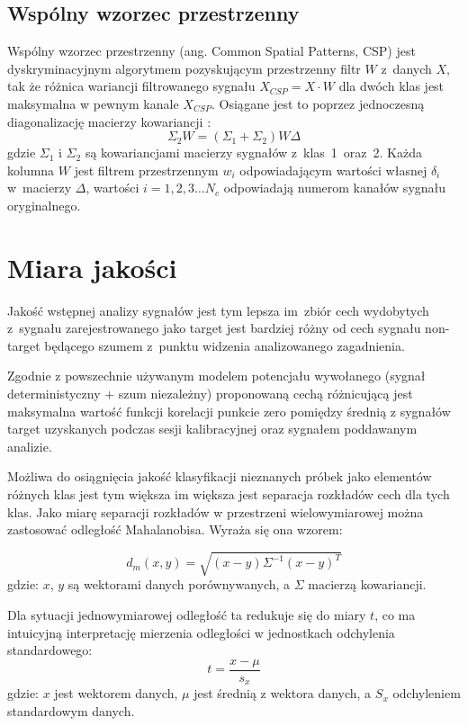 \documentclass[licencjacka,openright]{pracamgr}
\begin{document}
\subsection{Wspólny wzorzec przestrzenny}
Wspólny wzorzec przestrzenny (ang. Common Spatial Patterns, CSP) \citep{koles1990} jest dyskryminacyjnym algorytmem pozyskującym przestrzenny filtr $W$ z~danych $X$, tak że różnica wariancji filtrowanego sygnału \mbox{$X_{CSP} = X \cdot W$} dla dwóch klas jest maksymalna w pewnym kanale $X_{CSP}$. Osiągane jest to poprzez jednoczesną diagonalizację macierzy kowariancji \citep{samsek2012}:
\begin{equation}
\Sigma _2 W = (\Sigma _1 + \Sigma _2 )W \Delta
\end{equation}
gdzie $\Sigma_1$ i $\Sigma_2$ są kowariancjami macierzy sygnałów z~klas~1~oraz~2. Każda kolumna $W$ jest filtrem przestrzennym $w_i$ odpowiadającym wartości własnej $\delta _i$ w~macierzy $\Delta$, wartości $i = 1,2,3 \ldots N_c$ odpowiadają numerom kanałów sygnału oryginalnego.

\section{Miara jakości}
\label{miara}
Jakość wstępnej analizy sygnałów jest tym lepsza im~zbiór cech wydobytych z~sygnału zarejestrowanego jako target jest bardziej różny od cech sygnału non-target będącego szumem z~punktu widzenia analizowanego zagadnienia.

Zgodnie z powszechnie używanym modelem potencjału wywołanego (sygnał deterministyczny + szum niezależny) proponowaną cechą różnicującą jest maksymalna wartość funkcji korelacji punkcie zero pomiędzy średnią z sygnałów target uzyskanych podczas sesji kalibracyjnej oraz sygnałem poddawanym analizie.

Możliwa do osiągnięcia jakość klasyfikacji nieznanych próbek jako elementów różnych klas jest tym większa im większa jest separacja rozkładów cech dla tych klas. Jako miarę separacji rozkładów w przestrzeni wielowymiarowej można zastosować odległość Mahalanobisa. Wyraża się ona wzorem:

\begin{equation}
d_{m}{(x,y)}=\sqrt{(x-y)\Sigma^{-1}(x-y)^T}
\end{equation}
gdzie: $x$, $y$ są wektorami danych porównywanych, a $\Sigma$ macierzą kowariancji.

Dla sytuacji jednowymiarowej odległość ta redukuje się do miary $t$, co ma intuicyjną interpretację mierzenia odległości w jednostkach odchylenia standardowego:
\begin{equation}
t = \frac{x-\mu}{s_x}
\end{equation}
gdzie: $x$ jest wektorem danych, $\mu$ jest średnią z wektora danych, a $S_x$ odchyleniem standardowym danych.
\end{document}
